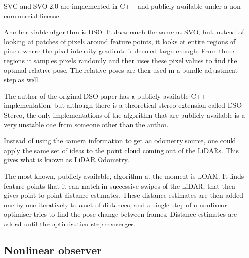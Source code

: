 \gls{SVO} and \gls{SVO} 2.0 are implemented in C++ and publicly available under a non-commercial license. 

Another viable algorithm is \gls{DSO}\cite{DSO}. It does much the same as \gls{SVO}, but instead of looking at patches of pixels around feature points, it looks at entire regions of pixels where the pixel intensity gradients is deemed large enough. From these regions it samples pixels randomly and then uses these pixel values to find the optimal relative pose. The relative poses are then used in a bundle adjustment step as well. 

The author of the original \gls{DSO} paper has a publicly available C++ implementation, but although there is a theoretical stereo extension called \gls{DSO} Stereo\cite{DSOStereo}, the only implementations of the algorithm that are publicly available is a very unstable one from someone other than the author. 

Instead of using the camera information to get an odometry source, one could apply the same set of ideas to the point cloud coming out of the \glspl{LiDAR}. This gives what is known as \gls{LiDAR} Odometry. 

The most known, publicly available, algorithm at the moment is LOAM\cite{LOAM}. It finds feature points that it can match in successive swipes of the \gls{LiDAR}, that then gives point to point distance estimates. These distance estimates are then added one by one iteratively to a set of distances, and a single step of a nonlinear optimiser tries to find the pose change between frames. Distance estimates are added until the optimisation step converges. 

\subsection{Nonlinear observer}


